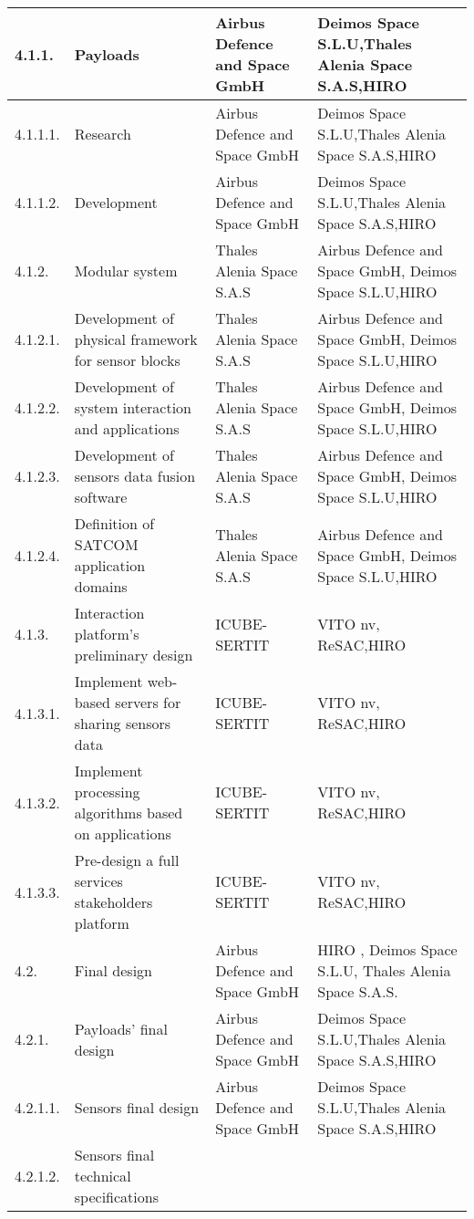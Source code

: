 \begin{longtable}[H]{l p{4cm} p{4cm} p{4cm}}
	\\ \midrule
	4.1.1. & Payloads &
	 Airbus Defence and Space GmbH&Deimos Space S.L.U,Thales Alenia Space S.A.S,HIRO
	\\ \midrule
	4.1.1.1. & Research &
	 Airbus Defence and Space GmbH&Deimos Space S.L.U,Thales Alenia Space S.A.S,HIRO
	\\ \midrule
	4.1.1.2. & Development &
	 Airbus Defence and Space GmbH&Deimos Space S.L.U,Thales Alenia Space S.A.S,HIRO
	\\ \midrule
	4.1.2. & Modular system&Thales Alenia Space S.A.S&Airbus Defence and Space GmbH, Deimos Space S.L.U,HIRO
	\\ \midrule
	4.1.2.1. & Development of physical framework for sensor blocks&Thales Alenia Space S.A.S&Airbus Defence and Space GmbH, Deimos Space S.L.U,HIRO
	\\ \midrule
	4.1.2.2. & Development of system interaction and applications&Thales Alenia Space S.A.S&Airbus Defence and Space GmbH, Deimos Space S.L.U,HIRO
	\\ \midrule
	4.1.2.3. & Development of sensors data fusion software&Thales Alenia Space S.A.S&Airbus Defence and Space GmbH, Deimos Space S.L.U,HIRO
	\\ \midrule
	4.1.2.4. &Definition of SATCOM application domains&Thales Alenia Space S.A.S&Airbus Defence and Space GmbH, Deimos Space S.L.U,HIRO
	\\ \midrule
	4.1.3. & Interaction platform's preliminary design &
	ICUBE-SERTIT&VITO nv, ReSAC,HIRO
	\\ \midrule
	4.1.3.1. & Implement web-based servers for sharing sensors data &
	ICUBE-SERTIT&VITO nv, ReSAC,HIRO
	\\ \midrule
	4.1.3.2. & Implement processing algorithms based on applications &
	ICUBE-SERTIT&VITO nv, ReSAC,HIRO
	\\ \midrule
	4.1.3.3. & Pre-design a full services stakeholders platform &
	ICUBE-SERTIT&VITO nv, ReSAC,HIRO
	\\ \midrule
	4.2. & Final design & 
	Airbus Defence and Space GmbH& HIRO , Deimos Space S.L.U, Thales Alenia Space S.A.S.
	\\ \midrule
	4.2.1. & Payloads' final design &
	Airbus Defence and Space GmbH&Deimos Space S.L.U,Thales Alenia Space S.A.S,HIRO
	\\ \midrule
	4.2.1.1. & Sensors final design &
	Airbus Defence and Space GmbH&Deimos Space S.L.U,Thales Alenia Space S.A.S,HIRO
	\\ \midrule
	4.2.1.2. & Sensors final technical specifications &

\end{longtable}
